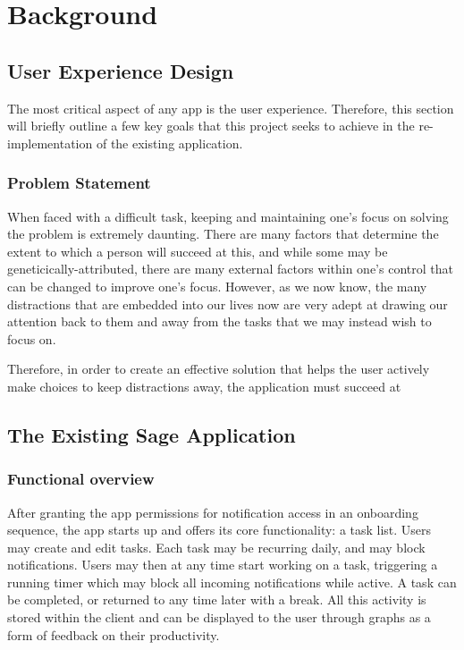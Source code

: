 \chapter{Background}

\label{ch:background}

\section{User Experience Design}
The most critical aspect of any app is the user experience. Therefore, this section will briefly outline a few key goals that this project seeks to achieve in the re-implementation of the existing application.

\subsection{Problem Statement}
When faced with a difficult task, keeping and maintaining one's focus on solving the problem is extremely daunting. There are many factors that determine the extent to which a person will succeed at this, and while some may be geneticically-attributed, there are many external factors within one's control that can be changed to improve one's focus. However, as we now know, the many distractions that are embedded into our lives now are very adept at drawing our attention back to them and away from the tasks that we may instead wish to focus on.

Therefore, in order to create an effective solution that helps the user actively make choices to keep distractions away, the application must succeed at 


\section{The Existing Sage Application}
\subsection{Functional overview}
After granting the app permissions for notification access in an onboarding sequence, the app starts up and offers its core functionality: a task list. Users may create and edit tasks. Each task may be recurring daily, and may block notifications. Users may then at any time start working on a task, triggering a running timer which may block all incoming notifications while active. A task can be completed, or returned to any time later with a break. All this activity is stored within the client and can be displayed to the user through graphs as a form of feedback on their productivity.

